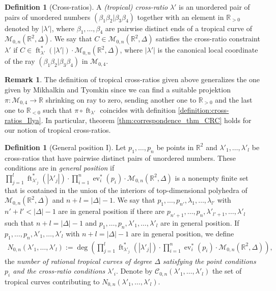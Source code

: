 \documentclass[11pt,reqno,a4]{amsart}
\theoremstyle{dotless}
\theoremstyle{definition}
\newtheorem{definition}[corollary]{Definition}
\newtheorem{remark}[corollary]{Remark}
\newcommand{\ft}{\operatorname{ft}}
\newcommand{\ev}{\operatorname{ev}}
\newcommand{\degree}{\operatorname{deg}}
\begin{document}
\begin{definition}[Cross-ratios]\label{Definition:tropical_cross-ratios}
A \textit{(tropical) cross-ratio} $\lambda'$ is an unordered pair of pairs of unordered numbers $\left(\beta_1\beta_2|\beta_3\beta_4\right)$ together with an element in $\mathbb{R}_{>0}$ denoted by $|\lambda'|$, where $\beta_1,\dots,\beta_4$ are pairwise distinct ends of a tropical curve of $\mathcal{M}_{0,n}\left(\mathbb{R}^2,\Delta \right)$. We say that $C\in\mathcal{M}_{0,n}\left(\mathbb{R}^2,\Delta \right)$ satisfies the cross-ratio constraint $\lambda'$ if $C\in\ft^*_{\lambda'}\left(|\lambda'| \right)\cdot \mathcal{M}_{0,n}\left(\mathbb{R}^2,\Delta \right)$, where $|\lambda'|$ is the canonical local coordinate of the ray $\left(\beta_1\beta_2|\beta_3\beta_4\right)$ in $\mathcal{M}_{0,4}$.
\end{definition}



\begin{remark}
The definition of tropical cross-ratios given above generalizes the one given by Mikhalkin and Tyomkin since we can find a suitable projektion $\pi:\mathcal{M}_{0,4}\to\mathbb{R}$ shrinking on ray to zero, sending another one to $\mathbb{R}_{>0}$ and the last one to $\mathbb{R}_{<0}$ such that $\pi\circ\ft_{\lambda'}$ coincides with definition \ref{definition:cross-ratios_Ilya}. In particular, theorem \ref{thm:correspondence_thm_CRC} holds for our notion of tropical cross-ratios.
\end{remark}


\begin{definition}[General position I]\label{definition:general_position_I}
Let $p_1,\dots,p_n$ be points in $\mathbb{R}^2$ and $\lambda'_1,\dots,\lambda'_l$ be cross-ratios that have pairwise distinct pairs of unordered numbers. These conditions are in \textit{general position} if $\prod_{j=1}^{l}\ft_{\lambda'_j}^*\left( |\lambda'_j|\right)\cdot\prod_{i=1}^n\ev_i^*\left( p_i\right)\cdot\mathcal{M}_{0,n}\left(\mathbb{R}^2,\Delta \right)$ is a nonempty finite set that is contained in the union of the interiors of top-dimensional polyhedra of $\mathcal{M}_{0,n}\left(\mathbb{R}^2,\Delta \right)$ and $n+l=|\Delta|-1$. We say that $p_1,\dots,p_{n'},\lambda_1,\dots,\lambda_{l'}$ with $n'+l'<|\Delta|-1$ are in general position if there are $p_{n'+1},\dots,p_n,\lambda'_{l'+1},\dots,\lambda'_l$ such that $n+l=|\Delta|-1$ and $p_1,\dots,p_n,\lambda'_1,\dots,\lambda'_l$ are in general position. If $p_1,\dots,p_n,\lambda'_1,\dots,\lambda'_l$ with $n+l=|\Delta|-1$ are in general position, we define
\begin{align}\label{eq:general_pos_1}
N_{0,n}\left(\lambda'_1,\dots,\lambda'_l\right):=\degree\left(\prod_{j=1}^{l}\ft_{\lambda'_j}^*\left( |\lambda'_j|\right)\cdot\prod_{i=1}^n\ev_i^*\left( p_i\right)\cdot\mathcal{M}_{0,n}\left(\mathbb{R}^2,\Delta \right)\right),
\end{align}
the {\it number of rational tropical curves of degree $\Delta$ satisfying the point conditions $p_i$ and the cross-ratio conditions $\lambda'_i$}. Denote by $\mathcal{C}_{0,n}\left( \lambda'_1,\dots,\lambda'_l\right)$ the set of tropical curves contributing to $N_{0,n}\left(\lambda'_1,\dots,\lambda'_l\right)$.
\end{definition}
\end{document}
